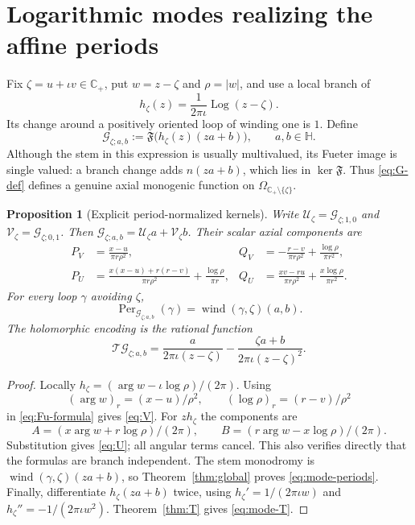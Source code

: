 \documentclass[11pt,a4paper]{article}
\numberwithin{equation}{section}
\newtheorem{proposition}[theorem]{Proposition}
\theoremstyle{definition}
\theoremstyle{remark}
\newcommand{\C}{\mathbb C}
\newcommand{\HH}{\mathbb H}
\newcommand{\Cp}{\C_+}
\newcommand{\Fu}{\mathfrak F}
\newcommand{\Per}{\operatorname{Per}}
\DeclareMathOperator{\Log}{Log}
\newcommand{\wind}{\operatorname{wind}}
\newcommand{\T}{\mathcal T}
\newcommand{\G}{\mathcal G}
\newcommand{\Uker}{\mathcal U}
\newcommand{\Vker}{\mathcal V}
\begin{document}
\section{Logarithmic modes realizing the affine periods}
\label{sec:modes}

Fix $\zeta=u+\iota v\in\Cp$, put $w=z-\zeta$ and $\rho=|w|$, and use
a local branch of
\begin{equation}\label{eq:logh}
 h_\zeta(z)=\frac{1}{2\pi\iota}\Log(z-\zeta).
\end{equation}
Its change around a positively oriented loop of winding one is $1$.
Define
\begin{equation}\label{eq:G-def}
 \G_{\zeta;a,b}:=\Fu\bigl(h_\zeta(z)(za+b)\bigr),\qquad a,b\in\HH.
\end{equation}
Although the stem in this expression is usually multivalued, its Fueter
image is single valued: a branch change adds $n(za+b)$, which lies in
$\ker\Fu$. Thus \eqref{eq:G-def} defines a genuine axial monogenic
function on $\Omega_{\Cp\setminus\{\zeta\}}$.

\begin{proposition}[Explicit period-normalized kernels]\label{prop:modes}
Write $\Uker_\zeta=\G_{\zeta;1,0}$ and
$\Vker_\zeta=\G_{\zeta;0,1}$. Then
$\G_{\zeta;a,b}=\Uker_\zeta a+\Vker_\zeta b$. Their scalar axial
components are
\begin{align}
 P_V&=\frac{x-u}{\pi r\rho^2},&
 Q_V&=-\frac{r-v}{\pi r\rho^2}+\frac{\log\rho}{\pi r^2},
 \label{eq:V}\\
 P_U&=\frac{x(x-u)+r(r-v)}{\pi r\rho^2}
                +\frac{\log\rho}{\pi r},&
 Q_U&=\frac{xv-ru}{\pi r\rho^2}
                +\frac{x\log\rho}{\pi r^2}.
 \label{eq:U}
\end{align}
For every loop $\gamma$ avoiding $\zeta$,
\begin{equation}\label{eq:mode-periods}
 \Per_{\G_{\zeta;a,b}}(\gamma)
       =\wind(\gamma,\zeta)(a,b).
\end{equation}
The holomorphic encoding is the rational function
\begin{equation}\label{eq:mode-T}
 \T\G_{\zeta;a,b}
 =\frac{a}{2\pi\iota(z-\zeta)}
  -\frac{\zeta a+b}{2\pi\iota(z-\zeta)^2}.
\end{equation}
\end{proposition}
\begin{proof}
Locally $h_\zeta=(\arg w-\iota\log\rho)/(2\pi)$.
Using
\[
 (\arg w)_r=(x-u)/\rho^2,\qquad
 (\log\rho)_r=(r-v)/\rho^2
\]
in \eqref{eq:Fu-formula} gives \eqref{eq:V}. For $zh_\zeta$ the
components are
\[
 A=(x\arg w+r\log\rho)/(2\pi),\qquad
 B=(r\arg w-x\log\rho)/(2\pi).
\]
Substitution gives \eqref{eq:U}; all angular terms cancel. This also
verifies directly that the formulas are branch independent.
The stem monodromy is $\wind(\gamma,\zeta)(za+b)$, so
Theorem~\ref{thm:global} proves \eqref{eq:mode-periods}.
Finally, differentiate $h_\zeta(za+b)$ twice, using
$h_\zeta'=1/(2\pi\iota w)$ and $h_\zeta''=-1/(2\pi\iota w^2)$.
Theorem~\ref{thm:T} gives \eqref{eq:mode-T}.
\end{proof}
\end{document}
